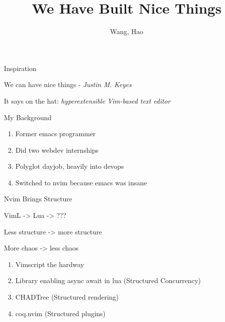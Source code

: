 \documentclass{beamer}
\title{We Have Built Nice Things}
\author{Wang, Hao}
\institute{Lead Engineer @ SunCloud}
\date{}
\begin{document}
\begin{frame}


	\titlepage

\end{frame}


\begin{frame}{Inspiration}


	We can have nice things - \em{Justin M. Keyes}

	It says on the hat: \em{hyperextensible} Vim-based text editor

\end{frame}


\begin{frame}{My Background}

	\begin{enumerate}

		\item Former emacs programmer

		\item Did two webdev internships

		\item Polyglot dayjob, heavily into devops

		\item Switched to nvim because emacs was insane


	\end{enumerate}


\end{frame}


\begin{frame}{Nvim Brings Structure}

	VimL -> Lua -> ???

	Less structure -> more structure

	More chaos -> less chaos

	\begin{enumerate}

		\item Vimscript the hardway


		\item Library enabling async await in lua (Structured Concurrency)


		\item CHADTree (Structured rendering)


		\item coq.nvim (Structured plugins)


	\end{enumerate}

\end{frame}
\end{document}
